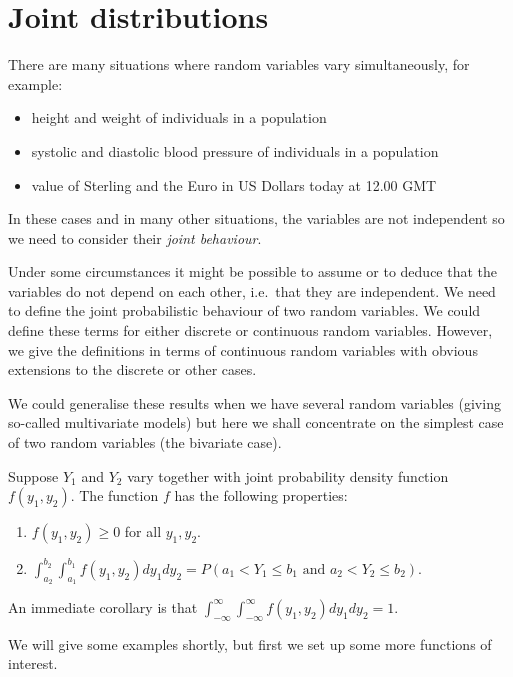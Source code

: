 \documentclass[]{book}
\providecommand{\tightlist}{%
  \setlength{\itemsep}{0pt}\setlength{\parskip}{0pt}}
\theoremstyle{definition}
\theoremstyle{definition}
\theoremstyle{definition}
\theoremstyle{remark}
\begin{document}
\section{Joint distributions}\label{joint-distributions}

There are many situations where random variables vary simultaneously,
for example:

\begin{itemize}
\tightlist
\item
  height and weight of individuals in a population
\item
  systolic and diastolic blood pressure of individuals in a population
\item
  value of Sterling and the Euro in US Dollars today at 12.00 GMT
\end{itemize}

In these cases and in many other situations, the variables are not
independent so we need to consider their \emph{joint behaviour}.

Under some circumstances it might be possible to assume or to deduce
that the variables do not depend on each other, i.e.~that they are
independent. We need to define the joint probabilistic behaviour of two
random variables. We could define these terms for either discrete or
continuous random variables. However, we give the definitions in terms
of continuous random variables with obvious extensions to the discrete
or other cases.

We could generalise these results when we have several random variables
(giving so-called multivariate models) but here we shall concentrate on
the simplest case of two random variables (the bivariate case).

Suppose \(Y_1\) and \(Y_2\) vary together with joint probability density
function \(f(y_1 , y_2)\). The function \(f\) has the following
properties:

\begin{enumerate}
\def\labelenumi{\arabic{enumi}.}
\tightlist
\item
  \(f(y_1, y_2) \geq 0\) for all \(y_1, y_2\).
\item
  \(\int_{a_2}^{b_2} \int_{a_1}^{b_1} f(y_1, y_2) dy_1 dy_2 = P(a_1 < Y_1 \leq b_1 \text{ and } a_2 < Y_2 \leq b_2)\).
\end{enumerate}

An immediate corollary is that
\(\int_{-\infty}^{\infty} \int_{-\infty}^{\infty} f(y_1, y_2) dy_1 dy_2 = 1\).

We will give some examples shortly, but first we set up some more
functions of interest.
\end{document}
